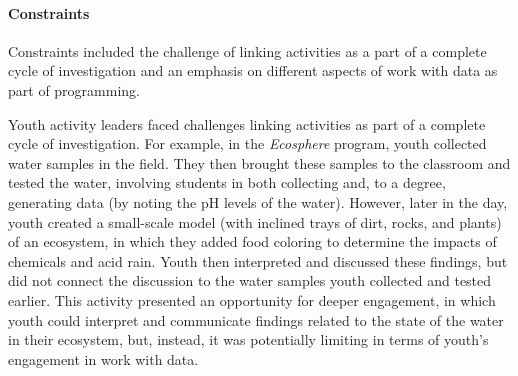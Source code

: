 \documentclass[]{msu-thesis}
\let\oldparagraph\paragraph
\renewcommand{\paragraph}[1]{\oldparagraph{#1}\mbox{}}
\theoremstyle{definition}
\theoremstyle{definition}
\theoremstyle{definition}
\theoremstyle{remark}
\begin{document}
\paragraph{Constraints}\label{constraints}

Constraints included the challenge of linking activities as a part of a
complete cycle of investigation and an emphasis on different aspects of
work with data as part of programming.

Youth activity leaders faced challenges linking activities as part of a
complete cycle of investigation. For example, in the \emph{Ecosphere}
program, youth collected water samples in the field. They then brought
these samples to the classroom and tested the water, involving students
in both collecting and, to a degree, generating data (by noting the pH
levels of the water). However, later in the day, youth created a
small-scale model (with inclined trays of dirt, rocks, and plants) of an
ecosystem, in which they added food coloring to determine the impacts of
chemicals and acid rain. Youth then interpreted and discussed these
findings, but did not connect the discussion to the water samples youth
collected and tested earlier. This activity presented an opportunity for
deeper engagement, in which youth could interpret and communicate
findings related to the state of the water in their ecosystem, but,
instead, it was potentially limiting in terms of youth's engagement in
work with data.
\end{document}
